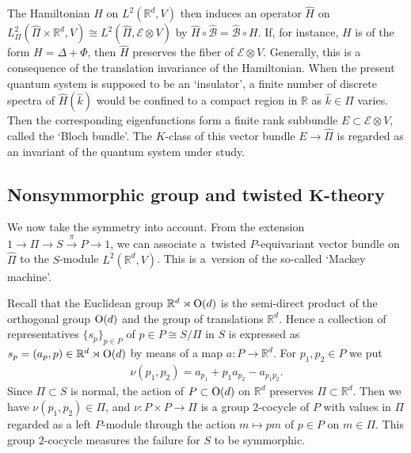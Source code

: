 \documentclass[pdftex]{sigma}
\theoremstyle{definition}
\newcommand{\R}{\mathbb{R}}
\begin{document}
The Hamiltonian $H$ on $L^2(\R^d, V)$ then induces an operator $\hat{H}$ on $L^2_{\Pi}(\hat{\Pi} \times \R^d, V) \cong L^2(\hat{\Pi}, \mathcal{E} \otimes V)$ by $\hat{H} \circ \mathcal{\hat{B}} = \mathcal{\hat{B}} \circ H$. If, for instance, $H$ is of the form $H = \Delta + \Phi$, then $\hat{H}$ preserves the f\/iber of $\mathcal{E} \otimes V$. Generally, this is a consequence of the translation invariance of the Hamiltonian. When the present quantum system is supposed to be an `insulator', a f\/inite number of discrete spectra of $\hat{H}(\hat{k})$ would be conf\/ined to a compact region in $\R$ as $\hat{k} \in \hat{\Pi}$ varies. Then the corresponding eigenfunctions form a f\/inite rank subbundle $E \subset \mathcal{E} \otimes V$, called the `Bloch bundle'. The $K$-class of this vector bundle $E \to \hat{\Pi}$ is regarded as an invariant of the quantum system under study.

\subsection[Nonsymmorphic group and twisted $K$-theory]{Nonsymmorphic group and twisted $\boldsymbol{K}$-theory}

We now take the symmetry into account. From the extension $1 \to \Pi \to S \overset{\pi}{\to} P \to 1$, we can associate a~twisted $P$-equivariant vector bundle on $\hat{\Pi}$ to the $S$-module $L^2(\R^d, V)$. This is a~version of the so-called `Mackey machine'.

Recall that the Euclidean group $\R^d \rtimes {\rm O}(d)$ is the semi-direct product of the orthogonal group ${\rm O}(d)$ and the group of translations $\R^d$. Hence a collection of representatives $\{ s_p \}_{p \in P}$ of $p \in P \cong S/\Pi$ in $S$ is expressed as $s_p = (a_p, p) \in \R^d \rtimes {\rm O}(d)$ by means of a map $a \colon P \to \R^d$. For $p_1, p_2 \in P$ we put
\begin{gather*}
\nu(p_1, p_2) = a_{p_1} + p_1 a_{p_2} - a_{p_1p_2}.
\end{gather*}
Since $\Pi \subset S$ is normal, the action of $P \subset {\rm O}(d)$ on $\R^d$ preserves $\Pi \subset \R^d$. Then we have $\nu(p_1, p_2) \in \Pi$, and $\nu \colon P \times P \to \Pi$ is a group $2$-cocycle of $P$ with values in $\Pi$ regarded as a left $P$-module through the action $m \mapsto pm$ of $p \in P$ on $m \in \Pi$. This group $2$-cocycle measures the failure for $S$ to be symmorphic.
\end{document}
